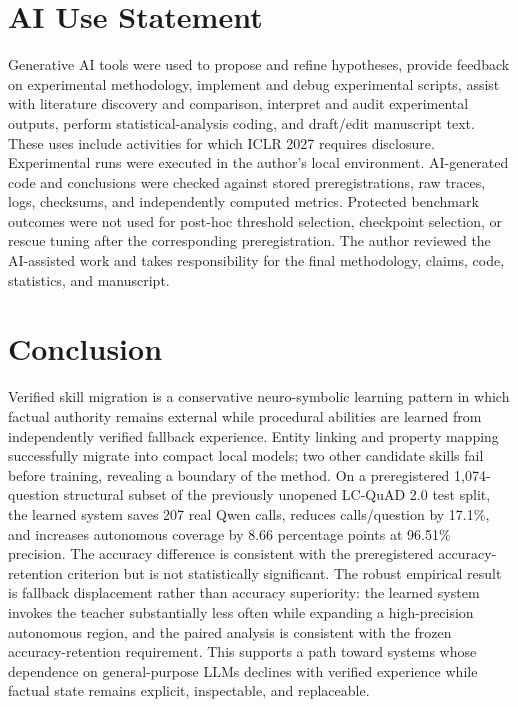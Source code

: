 \documentclass[10pt]{article}
\begin{document}
\section{AI Use Statement}
Generative AI tools were used to propose and refine hypotheses, provide feedback on experimental methodology, implement and debug experimental scripts, assist with literature discovery and comparison, interpret and audit experimental outputs, perform statistical-analysis coding, and draft/edit manuscript text. These uses include activities for which ICLR 2027 requires disclosure. Experimental runs were executed in the author's local environment. AI-generated code and conclusions were checked against stored preregistrations, raw traces, logs, checksums, and independently computed metrics. Protected benchmark outcomes were not used for post-hoc threshold selection, checkpoint selection, or rescue tuning after the corresponding preregistration. The author reviewed the AI-assisted work and takes responsibility for the final methodology, claims, code, statistics, and manuscript.

\section{Conclusion}
Verified skill migration is a conservative neuro-symbolic learning pattern in which factual authority remains external while procedural abilities are learned from independently verified fallback experience. Entity linking and property mapping successfully migrate into compact local models; two other candidate skills fail before training, revealing a boundary of the method. On a preregistered 1,074-question structural subset of the previously unopened LC-QuAD 2.0 test split, the learned system saves 207 real Qwen calls, reduces calls/question by 17.1\%, and increases autonomous coverage by 8.66 percentage points at 96.51\% precision. The accuracy difference is consistent with the preregistered accuracy-retention criterion but is not statistically significant. The robust empirical result is fallback displacement rather than accuracy superiority: the learned system invokes the teacher substantially less often while expanding a high-precision autonomous region, and the paired analysis is consistent with the frozen accuracy-retention requirement. This supports a path toward systems whose dependence on general-purpose LLMs declines with verified experience while factual state remains explicit, inspectable, and replaceable.



\end{document}
